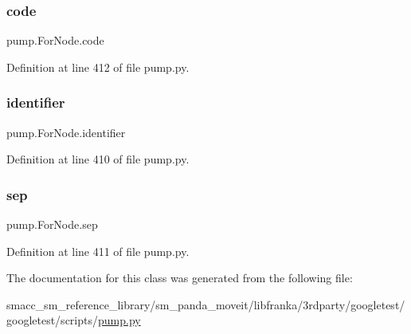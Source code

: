 \subsubsection{\texorpdfstring{code}{code}}
{\footnotesize\ttfamily pump.\+For\+Node.\+code}



Definition at line 412 of file pump.\+py.

\mbox{\label{classpump_1_1ForNode_a2444199e135e43696b3a006bd0d38982}} 
\subsubsection{\texorpdfstring{identifier}{identifier}}
{\footnotesize\ttfamily pump.\+For\+Node.\+identifier}



Definition at line 410 of file pump.\+py.

\mbox{\label{classpump_1_1ForNode_a06b493278b3c1ad53363a2bcc3b8efb3}} 
\subsubsection{\texorpdfstring{sep}{sep}}
{\footnotesize\ttfamily pump.\+For\+Node.\+sep}



Definition at line 411 of file pump.\+py.



The documentation for this class was generated from the following file\+:\begin{DoxyCompactItemize}
\item 
smacc\+\_\+sm\+\_\+reference\+\_\+library/sm\+\_\+panda\+\_\+moveit/libfranka/3rdparty/googletest/googletest/scripts/\hyperlink{pump_8py}{pump.\+py}\end{DoxyCompactItemize}

